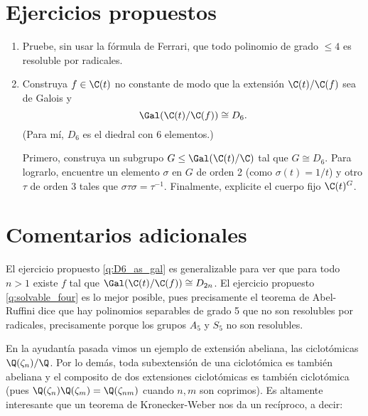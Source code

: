 \documentclass[11pt, reqno]{amsart}
\begin{document}
\section{Ejercicios propuestos}
\begin{enumerate}
	\item\label{q:solvable_four} Pruebe, sin usar la fórmula de Ferrari, que todo polinomio de grado $\le 4$ es resoluble por radicales.
	\item\label{q:D6_as_gal}\lookst
		Construya $f \in \C(t)$ no constante de modo que la extensión $\C(t)/\C(f)$ sea de Galois y
		\[
			\Gal( \C(t)/\C(f) ) \cong D_6.
		\]
		(Para mí, $D_6$ es el diedral con 6 elementos.)

		\begin{hint}
			Primero, construya un subgrupo $G \le \Gal(\C(t) / \C)$ tal que $G \cong D_6$.
			Para lograrlo, encuentre un elemento $\sigma$ en $G$ de orden 2 (como $\sigma(t) = 1/t$) y otro
			$\tau$ de orden 3 tales que $\sigma \tau \sigma = \tau^{-1}$.
			Finalmente, explicite el cuerpo fijo $\C(t)^G$.
		\end{hint}
\end{enumerate}

\section{Comentarios adicionales}
El ejercicio propuesto \ref{q:D6_as_gal} es generalizable para ver que para todo $n > 1$ existe $f$ tal que
$\Gal(\C(t)/\C(f)) \cong D_{2n}$.
El ejercicio propuesto \ref{q:solvable_four} es lo mejor posible, pues precisamente el teorema de Abel-Ruffini dice que
hay polinomios separables de grado 5 que no son resolubles por radicales, precisamente porque los grupos $A_5$ y $S_5$
no son resolubles.

En la ayudantía pasada vimos un ejemplo de extensión abeliana, las ciclotómicas $\Q(\zeta_n)/\Q$.
Por lo demás, toda subextensión de una ciclotómica es también abeliana y el composito de dos extensiones ciclotómicas es
también ciclotómica (pues $\Q(\zeta_n)\Q(\zeta_m) = \Q(\zeta_{nm})$ cuando $n, m$ son coprimos).
Es altamente interesante que un teorema de Kronecker-Weber nos da un recíproco, a decir:
\end{document}
